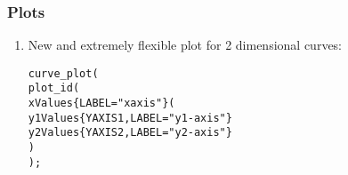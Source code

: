 \subsubsection{Plots}
\begin{enumerate}
\item New and extremely flexible plot for 2 dimensional curves:

\begin{boxedminipage}[t]{\linewidth}
\begin{alltt}
  \PLOTTWOD  curve_plot (
        plot\_id (
           xValues \{LABEL="xaxis"\} (
              y1Values \{YAXIS1, LABEL="y1-axis"\} 
              y2Values \{YAXIS2, LABEL="y2-axis"\} 
           )
       );
\end{alltt}
\end{boxedminipage}


\end{enumerate}
